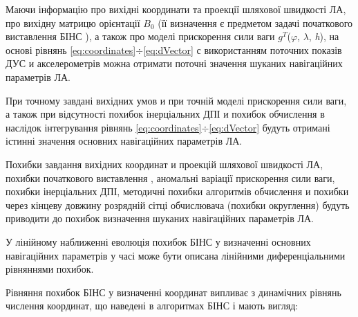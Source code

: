 Маючи інформацію  про вихідні координати та проекції шляхової швидкості ЛА, про вихідну 
матрицю орієнтації $B_{0}$ (її визначення є предметом задачі початкового виставлення  
БІНС ), а також про моделі прискорення сили ваги $g^{T}$($\varphi $, $\lambda $, \textit{h}), 
на основі рівнянь \eqref{eq:coordinates}$\div $\eqref{eq:dVector} с використанням  
поточних показів ДУС и акселерометрів можна отримати поточні значення  шуканих навігаційних 
параметрів ЛА.

При точному завдані вихідних умов и при точній  моделі прискорення сили ваги, а також 
при відсутності похибок інерціальних ДПІ и похибок обчислення в наслідок інтегрування 
рівнянь \eqref{eq:coordinates}$\div $\eqref{eq:dVector}  будуть отримані істинні 
значення основних навігаційних параметрів ЛА.

Похибки завдання вихідних координат и проекцій шляхової швидкості ЛА, похибки  початкового 
виставлення , аномальні варіації прискорення сили ваги, похибки інерціальних ДПІ, 
методичні похибки алгоритмів обчислення и похибки через  кінцеву довжину розрядній 
сітці обчислювача (похибки округлення) будуть приводити до похибок визначення шуканих 
навігаційних параметрів ЛА.

У лінійному наближенні еволюція похибок БІНС у визначенні основних навігаційних параметрів 
у часі може бути описана лінійними диференціальними рівняннями похибок.

Рівняння похибок БІНС у визначенні координат випливає з динамічних рівнянь числення 
координат, що наведені в алгоритмах БІНС і мають вигляд:

